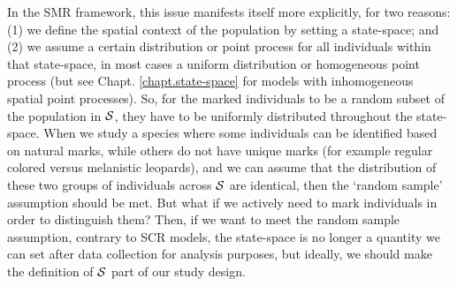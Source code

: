 In the SMR framework, this issue manifests itself more explicitly, for
two reasons: (1) we define the spatial context of the population by
setting a state-space; and (2) we assume a certain distribution or
point process for all individuals within that state-space, in most
cases a uniform distribution or homogeneous point process (but see
Chapt. \ref{chapt.state-space} for models with inhomogeneous spatial
point processes). So, for the marked individuals to be a random
subset %
of the population in ${\cal S}$, they have to be uniformly distributed
throughout the state-space. When we study a species where some
individuals can be identified based on natural marks, while others do
not have unique marks (for example regular colored versus melanistic
leopards), and we can assume that the distribution of these two groups
of individuals across ${\cal S}$ are identical, then the `random
sample' assumption should be met. But what if we actively need to mark
individuals in order to distinguish them?  Then, if we want to meet
the random sample assumption, contrary to SCR models, the state-space
is no longer a quantity we can set after data collection for analysis
purposes, but ideally, we should make the definition of ${\cal S}$
part of our study design.


